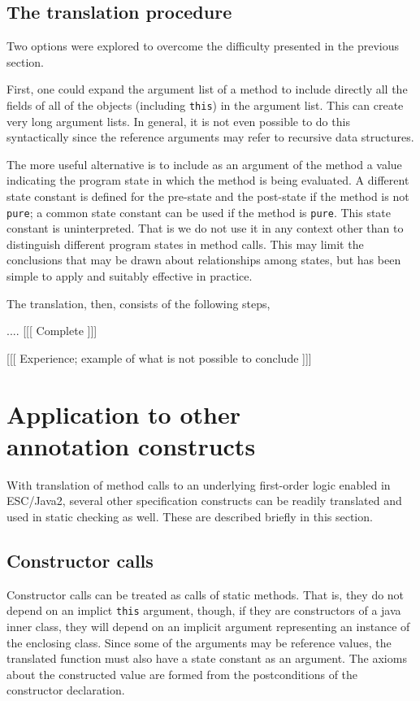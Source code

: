 \documentclass{sig-alternate}
\begin{document}
\subsection{The translation procedure}

Two options were explored to overcome the difficulty presented in the previous section.

First, one could expand the argument list of a method to include directly all the fields of all
of the objects (including \texttt{this}) in the argument list.  This can create very long
argument lists.  In general, it is not even possible to do this syntactically since the reference
arguments may refer to recursive data structures.

The more useful alternative is to include as an argument of the method a value indicating the
program state in which the method is being evaluated.  A different state constant is defined
for the pre-state and the post-state if the method is not \texttt{pure}; a common state
constant can be used if the method is \texttt{pure}.  This state constant is uninterpreted.
That is we do not use it in any context other than to distinguish different program states 
in method calls.
This may limit the conclusions that may be drawn about relationships among states, but has
been simple to apply and suitably effective in practice.

The translation, then, consists of the following steps,

.... [[[ Complete ]]]

[[[ Experience; example of what is not possible to conclude ]]]

\section{Application to other \\ annotation constructs}

With translation of method calls to an underlying first-order logic enabled in ESC/Java2, 
several other specification constructs can be readily translated and used in static checking as 
well.  These are described briefly in this section.
 
\subsection{Constructor calls}

Constructor calls can be treated as calls of static methods.  That is, they do not depend on an
implict \texttt{this} argument, though, if they are constructors of a java inner class, they will depend 
on an implicit argument representing an instance of the enclosing class.  Since some of the 
arguments may be reference values, the translated function must also have a state constant
as an argument.  The axioms about the constructed value are formed from the postconditions
of the constructor declaration.
\end{document}
